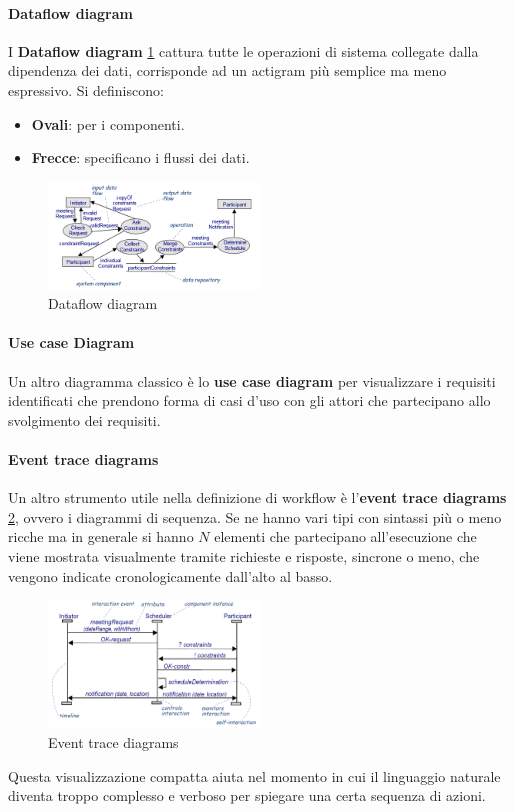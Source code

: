 \paragraph{Dataflow diagram}
I \textbf{Dataflow diagram} \ref{fig:dataflow-diagram} cattura tutte le operazioni
di sistema collegate dalla dipendenza dei dati, corrisponde ad un actigram più
semplice ma meno espressivo. Si definiscono:
\begin{itemize}
      \item \textbf{Ovali}: per i componenti.
      \item \textbf{Frecce}: specificano i flussi dei dati.
\end{itemize}
\begin{figure}[!ht]
      \centering
      \includegraphics[width=0.5\textwidth]{img/requirements/dataflow-diagram.png}
      \caption{Dataflow diagram}
      \label{fig:dataflow-diagram}
\end{figure}
\paragraph{Use case Diagram}
Un altro diagramma classico è lo \textbf{use case diagram} per visualizzare i
requisiti identificati che prendono forma di casi d'uso con gli attori che
partecipano allo svolgimento dei requisiti.
\paragraph{Event trace diagrams}
Un altro strumento utile nella definizione di workflow è l'\textbf{event trace
      diagrams} \ref{fig:etd}, ovvero i diagrammi di sequenza. Se ne hanno vari
tipi con sintassi più o meno ricche ma in generale si hanno $N$ elementi che
partecipano all'esecuzione che viene mostrata visualmente tramite richieste e
risposte, sincrone o meno, che vengono indicate cronologicamente dall'alto al basso.
\begin{figure}[!ht]
      \centering
      \includegraphics[width=0.5\textwidth]{img/requirements/etd.png}
      \caption{Event trace diagrams}
      \label{fig:etd}
\end{figure}
Questa visualizzazione compatta aiuta nel momento in cui il linguaggio naturale
diventa troppo complesso e verboso per spiegare una certa sequenza di azioni.
